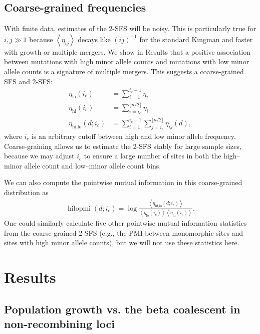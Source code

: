 \documentclass[11pt, letterpaper]{article}   	%
\newcommand{\floor}[1]{\lfloor #1 \rfloor}
\newcommand{\E}[1]{\left< #1 \right>}
\DeclareMathOperator{\hilopmi}{hilopmi}
\begin{document}
\subsection*{Coarse-grained frequencies}

With finite data, estimates of the 2-SFS will be noisy.
This is particularly true for $i,j\gg1$ because $\E{\eta_{ij}}$ decays like $(ij)^{-1}$ for the standard Kingman \autocite{Fu1995} and faster with growth or multiple mergers.
We show in Results that a positive association between mutations with high minor allele counts and mutations with low minor allele counts is a signature of multiple mergers.
This suggests a coarse-grained SFS and 2-SFS:
\begin{align}
    \eta_{\text{lo}}(i_c) &= \sum_{i=1}^{i_c-1} \eta_i \\
    \eta_{\text{hi}}(i_c) &= \sum_{i=i_c}^{\floor{n/2}} \eta_i \\
    \eta_{\text{hi,lo}}(d; i_c) &= \sum_{i=1}^{i_c-1} \sum_{j=i_c}^{\floor{n/2}} \eta_{ij}(d),
\end{align}
where $i_c$ is an arbitrary cutoff between high and low minor allele frequency.
Coarse-graining allows us to estimate the 2-SFS stably for large sample sizes, because we may adjust $i_c$ to ensure a large number of sites in both the high--minor allele count and low--minor allele count bins.

We can also compute the pointwise mutual information in this coarse-grained distribution as
\begin{align}
    \hilopmi(d; i_c) = \log \frac
                                {\E{\eta_{\text{hi,lo}}(d; i_c)}}
                                {\E{\eta_{\text{lo}}(i_c)}  \E{\eta_{\text{hi}}(i_c)}}.
\end{align}
One could similarly calculate five other pointwise mutual information statistics from the coarse-grained 2-SFS (e.g., the PMI between monomorphic sites and sites with high minor allele counts), but we will not use these statistics here.

\section*{Results \label{sec:results}}

\subsection*{Population growth vs. the beta coalescent in non-recombining loci}
\end{document}
